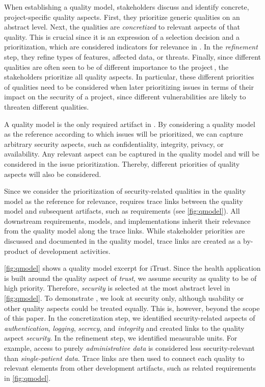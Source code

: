 When establishing a quality model, stakeholders discuss and identify concrete, project-specific quality aspects. First, they prioritize generic qualities on an abstract level.
Next, the qualities are \emph{concretized} to relevant aspects of that quality.
This is crucial since it is an expression of a selection decision and a prioritization, which are considered indicators for relevance in \appr.
In the \emph{refinement} step, they refine types of features, affected data, or threats.
Finally, since different qualities are often seen to be of different importance to the project\,\cite{Wagner2012}, the stakeholders prioritize all quality aspects.
In particular, these different priorities of qualities need to be considered when later prioritizing issues in terms of their impact on the security of a project, since different vulnerabilities are likely to threaten different qualities.

	A quality model is the only required artifact in \appr{}.
	By considering a quality model as the reference according to which issues will be prioritized, we can capture arbitrary security aspects, such as confidentiality, integrity, privacy, or availability.
	Any relevant aspect can be captured in the quality model and will be considered in the issue prioritization.
	Thereby, different priorities of quality aspects will also be considered.

Since we consider the prioritization of security-related qualities in the quality model as the reference for relevance, \appr{} requires trace links between the quality model and subsequent artifacts, such as requirements (see \autoref{fig:qmodel}).
All downstream requirements, models, and implementations inherit their relevance from the quality model along the trace links.
While stakeholder priorities are discussed and documented in the quality model, trace links are created as a by-product of development activities.



\autoref{fig:qmodel} shows a quality model excerpt for iTrust. %
Since the health application is built around the quality aspect of \emph{trust}, we assume security as quality to be of high priority.
Therefore, \emph{security} is selected at the most abstract level in \autoref{fig:qmodel}.
To demonstrate \appr{}, we look at security only, although usability or other quality aspects could be treated equally.
This is, however, beyond the scope of this paper. %
In the concretization step, we identified security-related aspects of \emph{authentication}, \emph{logging}, \emph{secrecy}, and \emph{integrity} and created links to the quality aspect \emph{security}.
In the refinement step, we identified measurable units.
For example, access to purely \emph{administrative data} is considered less security-relevant than \emph{single-patient data}.
Trace links are then used to connect each quality to relevant elements from other development artifacts, such as related requirements in \autoref{fig:qmodel}.

